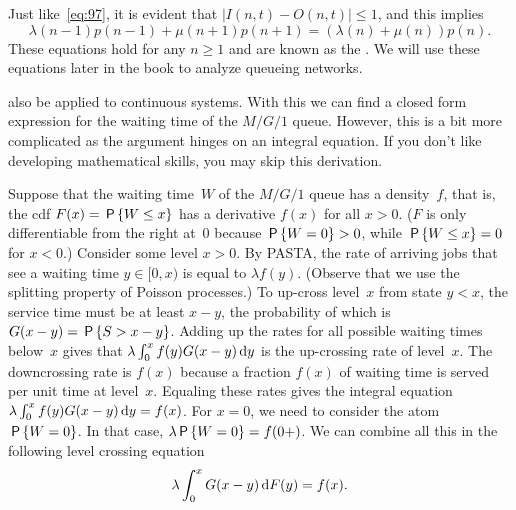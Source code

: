 \documentclass[queueing-book.tex]{subfiles}
\begin{document}
Just like~\cref{eq:97}, it is evident that $|I(n,t)-O(n,t)|\leq 1$, and this implies
\begin{equation}\label{eq:104}
 \lambda(n-1)p(n-1)+\mu(n+1)p(n+1) = (\lambda(n)+\mu(n))p(n).
\end{equation}
These equations hold for any $n\geq 1$ and are known as the .
We will use these equations later in the book to analyze queueing networks.


 also be applied to continuous systems.
With this we can find a closed form expression for the waiting time of the $M/G/1$ queue.
However, this is a bit more complicated as the argument hinges on an integral equation.
If you don't like developing mathematical skills, you may skip this derivation.

Suppose that the waiting time~$W$ of the $M/G/1$ queue has a density~$f$, that is, the cdf $F(x) = \P{W\leq x}$ has a derivative $f(x)$ for all $x>0$.
($F$ is only differentiable from the right at~$0$ because $\P{W=0}>0$, while $\P{W\leq x} = 0$ for $x<0$.)
Consider some level $x>0$.
By PASTA, the rate of arriving jobs that see a waiting time $y \in [0, x)$ is equal to $\lambda f(y)$. (Observe that we use the splitting property of Poisson processes.)
To up-cross level~$x$ from state $y< x$, the service time must be at least $x-y$, the probability of which is $G(x-y) = \P{S>x-y}$.
Adding up the rates for all possible waiting times below~$x$ gives that $\lambda\int_0^x f(y) G(x-y)\d y$ is the up-crossing rate of level~$x$.
The downcrossing rate is $f(x)$ because a fraction $f(x)$ of waiting time is served per unit time at level~$x$.
Equaling these rates gives the integral equation $\lambda \int_0^{x} f(y) G(x-y)\d y = f(x)$.
For $x=0$, we need to consider the atom $\P{W=0}$.
In that case, $\lambda \P{W=0} = f(0+)$.
We can combine all this in the following level crossing equation
\begin{equation*}
\lambda\int_0^x G(x-y) \d F(y) = f(x).
\end{equation*}
\end{document}

